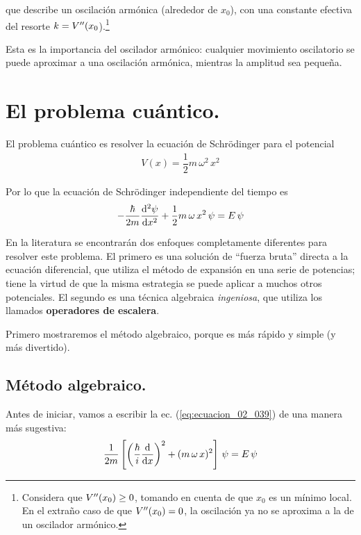 que describe un oscilación armónica (alrededor de $x_{0}$), con una constante efectiva del resorte $k = {V}^{\prime \prime} (x_{0}$).\footnote{Considera que ${V}^{\prime \prime}(x_{0})\geq 0$, tomando en cuenta de que $x_{0}$ es un mínimo local. En el extraño caso de que ${V}^{\prime \prime} (x_{0})= 0$, la oscilación ya no se aproxima a la de un oscilador armónico.}
\par
Esta es la importancia del oscilador armónico: cualquier movimiento oscilatorio se puede aproximar a una oscilación armónica, mientras la amplitud sea pequeña.

\section{El problema cuántico.}

El problema cuántico es resolver la ecuación de Schrödinger para el potencial
\begin{align}
V(x) = \dfrac{1}{2} m \, \omega^{2} \, x^{2}
\label{eq:ecuacion_02_038}
\end{align}

Por lo que la ecuación de Schrödinger independiente del tiempo es
\begin{align}
- \dfrac{\hbar}{2 m} \dv[2]{\psi}{x} + \dfrac{1}{2} m \, \omega \, x^{2} \, \psi = E \, \psi
\label{eq:ecuacion_02_039}
\end{align}

En la literatura se encontrarán dos enfoques completamente diferentes para resolver este problema. El primero es una solución de \enquote{fuerza bruta} directa a la ecuación diferencial, que utiliza el método de expansión en una serie de potencias; tiene la virtud de que la misma estrategia se puede aplicar a muchos otros potenciales. El segundo es una técnica algebraica \emph{ingeniosa}, que utiliza los llamados \textbf{operadores de escalera}.
\par
Primero mostraremos el método algebraico, porque es más rápido y simple (y más divertido).

\subsection{Método algebraico.}

Antes de iniciar, vamos a escribir la ec. (\ref{eq:ecuacion_02_039}) de una manera más sugestiva:
\begin{align}
\dfrac{1}{2 m} \left[ \left( \dfrac{\hbar}{i} \dv{x} \right)^{2} + (m \, \omega \, x)^{2} \right] \, \psi = E \, \psi
\label{eq:ecuacion_02_040}
\end{align}

